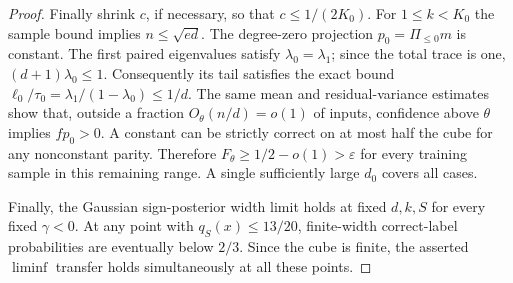 \begin{proof}
Finally shrink $c$, if necessary, so that $c\le1/(2K_0)$.
For $1\le k<K_0$ the sample bound implies $n\le\sqrt{ed}$.
The degree-zero projection $p_0=\Pi_{\le0}m$ is constant.
The first paired eigenvalues satisfy $\lambda_0=\lambda_1$;
since the total trace is one, $(d+1)\lambda_0\le1$.
Consequently its tail satisfies the exact bound
$\ell_0/\tau_0=\lambda_1/(1-\lambda_0)\le1/d$.
The same mean and residual-variance estimates show that, outside a
fraction $O_\theta(n/d)=o(1)$ of inputs, confidence above $\theta$
implies $fp_0>0$. A constant can be strictly correct on at most half
the cube for any nonconstant parity. Therefore
$F_\theta\ge1/2-o(1)>\varepsilon$ for every training sample in this
remaining range. A single sufficiently large $d_0$ covers all cases.

Finally, the Gaussian sign-posterior width limit holds at fixed
$d,k,S$ for every fixed $\gamma<0$. At any point with
$q_S(x)\le13/20$, finite-width correct-label probabilities are eventually
below $2/3$. Since the cube is finite, the asserted $\liminf$ transfer
holds simultaneously at all these points.
\end{proof}
